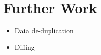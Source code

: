 \chapter{Further Work}
\label{chap:further-work}

\begin{itemize}
    \item Data de-duplication
    \item Diffing
\end{itemize}
